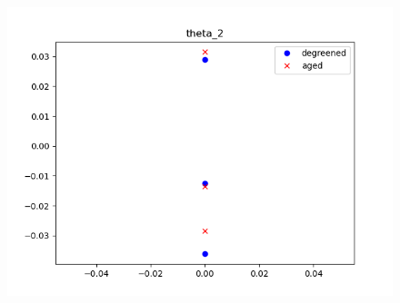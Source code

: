 \begin{figure}[H]
\begin{minipage}{0.3\textwidth}
                \includegraphics[width = \textwidth]{./figs/figs_new_mdl/theta_2.png}
        \end{minipage}
\end{figure}

